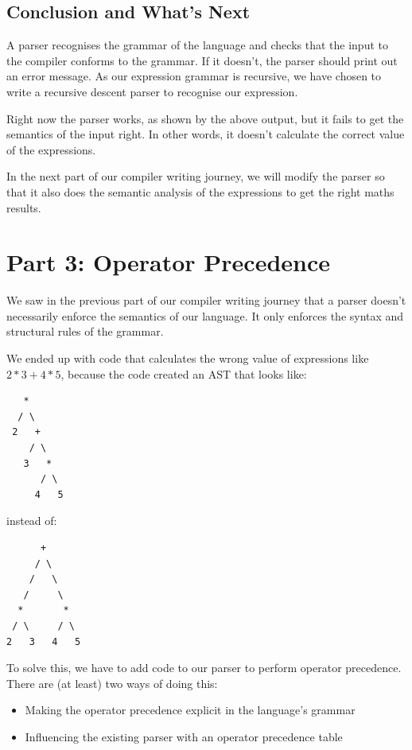 \documentclass[a4paper,12pt]{article}
\begin{document}
\subsection{Conclusion and What's Next}

A parser recognises the grammar of the language and checks that the input to the compiler conforms to the grammar. If it doesn't, the parser should print out an error message. As our expression grammar is recursive, we have chosen to write a recursive descent parser to recognise our expression.

Right now the parser works, as shown by the above output, but it fails to get the semantics of the input right. In other words, it doesn't calculate the correct value of the expressions.

In the next part of our compiler writing journey, we will modify the parser so that it also does the semantic analysis of the expressions to get the right maths results.

\section{Part 3: Operator Precedence}

We saw in the previous part of our compiler writing journey that a parser doesn't necessarily enforce the semantics of our language. It only enforces the syntax and structural rules of the grammar.

We ended up with code that calculates the wrong value of expressions like $2*3+4*5$, because the code created an AST that looks like:

\begin{lstlisting}
   *
  / \
 2   +
    / \
   3   *
      / \
     4   5
\end{lstlisting}

instead of:

\begin{lstlisting}
      +
     / \
    /   \
   /     \
  *       *
 / \     / \
2   3   4   5
\end{lstlisting}

To solve this, we have to add code to our parser to perform operator precedence. There are (at least) two ways of doing this:

\begin{itemize}
  \item Making the operator precedence explicit in the language's grammar
  \item Influencing the existing parser with an operator precedence table
\end{itemize}
\end{document}
